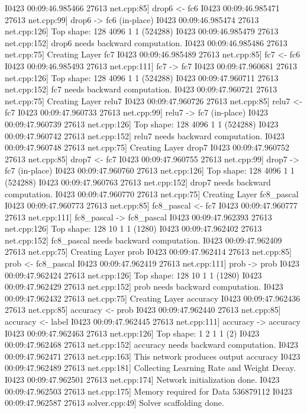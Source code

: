 \documentclass{article}
\begin{document}
I0423 00:09:46.985466 27613 net.cpp:85] drop6 <- fc6
I0423 00:09:46.985471 27613 net.cpp:99] drop6 -> fc6 (in-place)
I0423 00:09:46.985474 27613 net.cpp:126] Top shape: 128 4096 1 1 (524288)
I0423 00:09:46.985479 27613 net.cpp:152] drop6 needs backward computation.
I0423 00:09:46.985486 27613 net.cpp:75] Creating Layer fc7
I0423 00:09:46.985489 27613 net.cpp:85] fc7 <- fc6
I0423 00:09:46.985493 27613 net.cpp:111] fc7 -> fc7
I0423 00:09:47.960681 27613 net.cpp:126] Top shape: 128 4096 1 1 (524288)
I0423 00:09:47.960711 27613 net.cpp:152] fc7 needs backward computation.
I0423 00:09:47.960721 27613 net.cpp:75] Creating Layer relu7
I0423 00:09:47.960726 27613 net.cpp:85] relu7 <- fc7
I0423 00:09:47.960733 27613 net.cpp:99] relu7 -> fc7 (in-place)
I0423 00:09:47.960739 27613 net.cpp:126] Top shape: 128 4096 1 1 (524288)
I0423 00:09:47.960742 27613 net.cpp:152] relu7 needs backward computation.
I0423 00:09:47.960748 27613 net.cpp:75] Creating Layer drop7
I0423 00:09:47.960752 27613 net.cpp:85] drop7 <- fc7
I0423 00:09:47.960755 27613 net.cpp:99] drop7 -> fc7 (in-place)
I0423 00:09:47.960760 27613 net.cpp:126] Top shape: 128 4096 1 1 (524288)
I0423 00:09:47.960763 27613 net.cpp:152] drop7 needs backward computation.
I0423 00:09:47.960770 27613 net.cpp:75] Creating Layer fc8_pascal
I0423 00:09:47.960773 27613 net.cpp:85] fc8_pascal <- fc7
I0423 00:09:47.960777 27613 net.cpp:111] fc8_pascal -> fc8_pascal
I0423 00:09:47.962393 27613 net.cpp:126] Top shape: 128 10 1 1 (1280)
I0423 00:09:47.962402 27613 net.cpp:152] fc8_pascal needs backward computation.
I0423 00:09:47.962409 27613 net.cpp:75] Creating Layer prob
I0423 00:09:47.962414 27613 net.cpp:85] prob <- fc8_pascal
I0423 00:09:47.962419 27613 net.cpp:111] prob -> prob
I0423 00:09:47.962424 27613 net.cpp:126] Top shape: 128 10 1 1 (1280)
I0423 00:09:47.962429 27613 net.cpp:152] prob needs backward computation.
I0423 00:09:47.962432 27613 net.cpp:75] Creating Layer accuracy
I0423 00:09:47.962436 27613 net.cpp:85] accuracy <- prob
I0423 00:09:47.962440 27613 net.cpp:85] accuracy <- label
I0423 00:09:47.962445 27613 net.cpp:111] accuracy -> accuracy
I0423 00:09:47.962463 27613 net.cpp:126] Top shape: 1 2 1 1 (2)
I0423 00:09:47.962468 27613 net.cpp:152] accuracy needs backward computation.
I0423 00:09:47.962471 27613 net.cpp:163] This network produces output accuracy
I0423 00:09:47.962489 27613 net.cpp:181] Collecting Learning Rate and Weight Decay.
I0423 00:09:47.962501 27613 net.cpp:174] Network initialization done.
I0423 00:09:47.962503 27613 net.cpp:175] Memory required for Data 536879112
I0423 00:09:47.962587 27613 solver.cpp:49] Solver scaffolding done.
\end{document}
